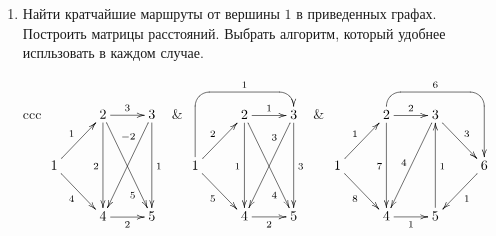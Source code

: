 \begin{enumerate}
    \item Найти кратчайшие маршруты от вершины $1$ в приведенных графах. Построить матрицы расстояний. Выбрать алгоритм, который удобнее испльзовать в каждом случае.
    
    \begin{tabular}{ccc}
        \(    
            {\xymatrix{
                *{}
                    &2 \ar@{->}[r]^{3} \ar@{->}[ddr]_(.75){5} \ar@{->}[dd]_{2}
                        &3 \ar@{->}[dd]^{1} \ar@{->}[ddl]_(.25){-2}
                            \\
                1 \ar@{->}[ur]^{1} \ar@{->}[dr]_{4}
                    &*{}
                        &*{}
                            \\
                *{}
                    &4 \ar@{->}[r]_{2}
                        &5
            }}
        \)   
        &        
        \(    
            {\xymatrix{
                *{}
                    &2 \ar@{->}[r]^{1} \ar@{->}[ddr]_(.75){4} \ar@{->}[dd]_{1}
                        &3 \ar@{->}[dd]^{3} \ar@{->}[ddl]_(.25){3}
                            \ar@{<-}`u[l]`[ll]_{1}[dll]
                            \\
                1 \ar@{->}[ur]^{2} \ar@{->}[dr]_{5}
                    &*{}
                        &*{}
                            \\
                *{}
                    &4 \ar@{->}[r]_{2}
                        &5
            }}
        \)
        &
        \(    
            {\xymatrix{
                *{}
                    &2 \ar@{->}[r]^{2} \ar@{->}[dd]_{7} \ar@{->}`u[r]`[rr]^{6}[drr]
                        &3 \ar@{->}[ddl]_{4} \ar@{->}[dr]^{3} 
                            &*{}
                                \\
                1 \ar@{->}[ur]^{1} \ar@{->}[dr]_{8}
                    &*{}
                        &*{}
                            &6 \ar@{->}[dl]^{1} 
                                \\
                *{}
                    &4 \ar@{->}[r]_{1}
                        &5 \ar@{->}[uu]_{1}
                            &*{}
            }}
        \)
    \end{tabular}
    

\end{enumerate}
